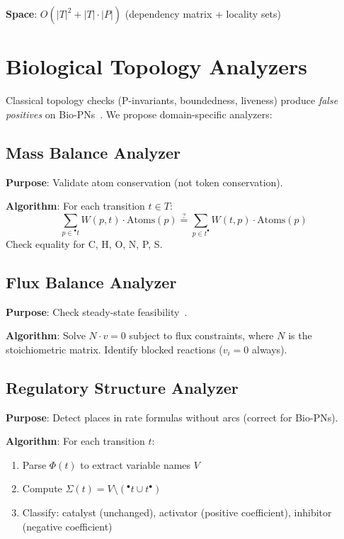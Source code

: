 \documentclass[runningheads]{llncs}
\newcommand{\preset}[1]{\ensuremath{{}^{\bullet}#1}}
\newcommand{\postset}[1]{\ensuremath{#1^{\bullet}}}
\newcommand{\RegSet}[1]{\ensuremath{\Sigma(#1)}}
\begin{document}
\textbf{Space}: $O(|T|^2 + |T| \cdot |P|)$ (dependency matrix + locality sets)

\section{Biological Topology Analyzers}

Classical topology checks (P-invariants, boundedness, liveness) produce \emph{false positives} on Bio-PNs~\cite{Chaouiya2007}. We propose domain-specific analyzers:

\subsection{Mass Balance Analyzer}

\textbf{Purpose}: Validate atom conservation (not token conservation).

\textbf{Algorithm}: For each transition $t \in T$:
\begin{equation}
\sum_{p \in \preset{t}} W(p,t) \cdot \text{Atoms}(p) \stackrel{?}{=} \sum_{p \in \postset{t}} W(t,p) \cdot \text{Atoms}(p)
\end{equation}
Check equality for C, H, O, N, P, S.

\subsection{Flux Balance Analyzer}

\textbf{Purpose}: Check steady-state feasibility~\cite{Orth2010}.

\textbf{Algorithm}: Solve $N \cdot v = 0$ subject to flux constraints, where $N$ is the stoichiometric matrix. Identify blocked reactions ($v_i = 0$ always).

\subsection{Regulatory Structure Analyzer}

\textbf{Purpose}: Detect places in rate formulas without arcs (correct for Bio-PNs).

\textbf{Algorithm}: For each transition $t$:
\begin{enumerate}
    \item Parse $\Phi(t)$ to extract variable names $V$
    \item Compute $\RegSet{t} = V \setminus (\preset{t} \cup \postset{t})$
    \item Classify: catalyst (unchanged), activator (positive coefficient), inhibitor (negative coefficient)
\end{enumerate}
\end{document}
